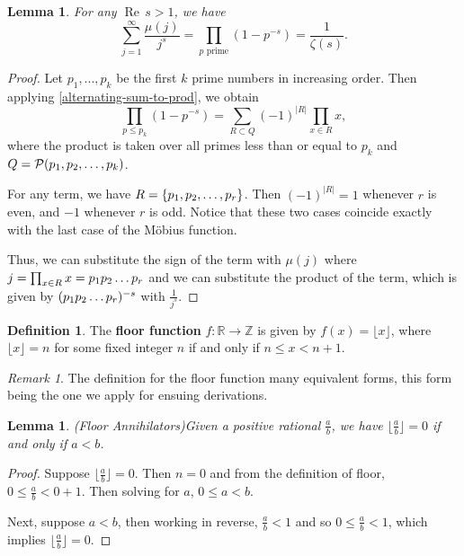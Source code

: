 \documentclass[10pt,a4paper]{article}
\newtheorem{lemma}[theorem]{Lemma}
\theoremstyle{definition}
\newtheorem{definition}{Definition}[section]
\theoremstyle{remark}
\newtheorem{remark}{Remark}
\begin{document}
\begin{lemma}\label{mobious-riemann} 
For any $\operatorname{Re} \, s > 1$, we have
$$\sum_{j=1}^{\infty} \frac{\mu(j)}{j^s}=\prod_{p \textrm{ prime}} (1-p^{-s})=\frac{1}{\zeta(s)}.$$
\end{lemma}

\begin{proof}
Let $p_1, ..., p_k$ be the first $k$ prime numbers in increasing order. Then applying \cref{alternating-sum-to-prod}, we obtain
$$\prod_{p \leq p_k} (1-p^{-s})=\sum_{R\subset Q}(-1)^{|R|}\prod_{x\in R}x,$$ 
where the product is taken over all primes less than or equal to $p_k$ and $Q = \mathcal{P}(p_1,p_2,\mathellipsis,p_k)$.
		
		For any term, we have \(R=\{p_1,p_2,\mathellipsis, p_r\}\). Then \((-1)^{|R|} = 1\) whenever \(r\) is even, and \(-1\) whenever \(r\) is odd.
		Notice that these two cases coincide exactly with the last case of the M\"obius function.
					
		Thus, we can substitute the sign of the term with \(\mu(j)\) where \(j=\prod_{x\in R}x=p_1p_2\mathellipsis p_r\) and we can substitute the product of the term, which is given by \((p_1p_2\mathellipsis p_r)^{-s}\) with \(\frac{1}{j^{s}}\). 
	\end{proof}

\begin{definition} The \textbf{floor function} $f: \mathbb{R} \to \mathbb{Z}$ is given by $f(x) = \lfloor x \rfloor$, where $\lfloor x \rfloor = n$ for some fixed integer $n$ if and only if $n\leq x < n+1$.
\end{definition}

\begin{remark}
The definition for the floor function many equivalent forms, this form being the one we apply for ensuing derivations.
\end{remark}

\begin{lemma}(Floor Annihilators)\label{floor-annihilators}
Given a positive rational $\frac{a}{b}$, we have \(\lfloor \frac{a}{b}\rfloor = 0\) if and only if \(a<b\). 
\end{lemma}
\begin{proof}
Suppose \(\lfloor \frac{a}{b} \rfloor = 0\). Then \(n=0\) and from the definition of floor, \(0\leq \frac{a}{b} < 0+1\). Then solving for \(a\), \(0\leq a < b\).
	
Next, suppose \(a<b\), then working in reverse, \(\frac{a}{b}<1\)  and so \(0\leq \frac{a}{b} < 1\), which implies \(\lfloor \frac{a}{b} \rfloor = 0\). 
\end{proof}
\end{document}
